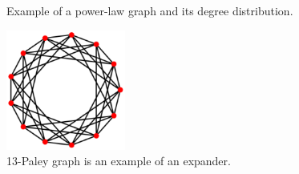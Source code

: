 \begin{figure}
    \centering
    \qquad
    \caption{Example of a power-law graph and its degree distribution.}
    \label{fig:power-law-graph-and-deg-distr}
\end{figure}

\begin{figure}
    \centering
    \includegraphics[width=0.35\textwidth]{images/paley}
    \caption{13-Paley graph is an example of an expander.}
    \label{fig:paley-graph}
\end{figure}

